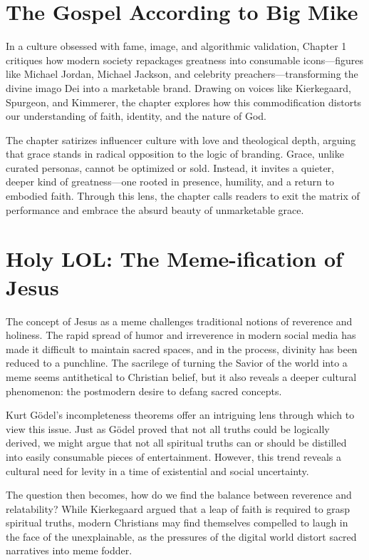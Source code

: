 \documentclass[a4paper,11pt]{book}
\begin{document}
\section{The Gospel According to Big Mike}

In a culture obsessed with fame, image, and algorithmic validation, Chapter 1 critiques how modern society repackages greatness into consumable icons—figures like Michael Jordan, Michael Jackson, and celebrity preachers—transforming the divine imago Dei into a marketable brand. Drawing on voices like Kierkegaard, Spurgeon, and Kimmerer, the chapter explores how this commodification distorts our understanding of faith, identity, and the nature of God.

The chapter satirizes influencer culture with love and theological depth, arguing that grace stands in radical opposition to the logic of branding. Grace, unlike curated personas, cannot be optimized or sold. Instead, it invites a quieter, deeper kind of greatness—one rooted in presence, humility, and a return to embodied faith. Through this lens, the chapter calls readers to exit the matrix of performance and embrace the absurd beauty of unmarketable grace.

\section{Holy LOL: The Meme-ification of Jesus}

The concept of Jesus as a meme challenges traditional notions of reverence and holiness. The rapid spread of humor and irreverence in modern social media has made it difficult to maintain sacred spaces, and in the process, divinity has been reduced to a punchline. The sacrilege of turning the Savior of the world into a meme seems antithetical to Christian belief, but it also reveals a deeper cultural phenomenon: the postmodern desire to defang sacred concepts.

Kurt Gödel’s incompleteness theorems offer an intriguing lens through which to view this issue. Just as Gödel proved that not all truths could be logically derived, we might argue that not all spiritual truths can or should be distilled into easily consumable pieces of entertainment. However, this trend reveals a cultural need for levity in a time of existential and social uncertainty. 

The question then becomes, how do we find the balance between reverence and relatability? While Kierkegaard argued that a leap of faith is required to grasp spiritual truths, modern Christians may find themselves compelled to laugh in the face of the unexplainable, as the pressures of the digital world distort sacred narratives into meme fodder.
\end{document}
